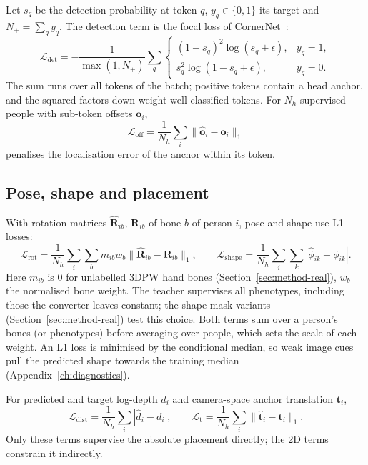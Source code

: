 Let $s_q$ be the detection probability at token $q$, $y_q\in\{0,1\}$ its target and $N_+=\sum_q y_q$. The detection
term is the focal loss of CornerNet~\cite{law2018cornernet}:
\begin{equation}
 \mathcal L_{\mathrm{det}}=
 -\frac{1}{\max(1,N_+)}\sum_q
\begin{cases}
 (1-s_q)^2\log(s_q+\epsilon), & y_q=1,\\
 s_q^2\log(1-s_q+\epsilon), & y_q=0 .
\end{cases}
\label{eq:loss-detection}
\end{equation}
The sum runs over all tokens of the batch; positive tokens contain a head anchor, and the squared factors down-weight
well-classified tokens. For
$N_h$ supervised people with sub-token offsets $\mathbf o_i$,
\begin{equation}
 \mathcal L_{\mathrm{off}}=\frac{1}{N_h}\sum_i
 \|\widehat{\mathbf o}_i-\mathbf o_i\|_1
\label{eq:loss-offset}
\end{equation}
penalises the localisation error of the anchor within its token.

\subsection{Pose, shape and placement}

With rotation matrices $\widehat{\mathbf R}_{ib}$, $\mathbf R_{ib}$ of bone $b$ of person $i$, pose and shape use L1
losses:
\begin{equation}
 \mathcal L_{\mathrm{rot}}=\frac{1}{N_h}\sum_i\sum_b
 m_{ib}w_b\|\widehat{\mathbf R}_{ib}-\mathbf R_{ib}\|_1,\qquad
 \mathcal L_{\mathrm{shape}}=\frac{1}{N_h}\sum_i\sum_k
 |\widehat{\phi}_{ik}-\phi_{ik}|.
\label{eq:loss-parameters}
\end{equation}
Here $m_{ib}$ is 0 for unlabelled 3DPW hand bones (Section~\ref{sec:method-real}), $w_b$ the normalised bone weight. The teacher supervises all phenotypes, including those the converter leaves constant; the shape-mask variants
(Section~\ref{sec:method-real}) test this choice. Both terms sum over a person's bones (or phenotypes) before
averaging over people, which sets the scale of each weight. An L1
loss is minimised by the conditional median, so weak image cues pull the predicted shape towards the training median
(Appendix~\ref{ch:diagnostics}).

For predicted and target log-depth $d_i$ and camera-space anchor translation $\mathbf t_i$,
\begin{equation}
 \mathcal L_{\mathrm{dist}}=\frac{1}{N_h}\sum_i|\widehat d_i-d_i|,\qquad
 \mathcal L_{\mathrm t}=\frac{1}{N_h}\sum_i\|\widehat{\mathbf t}_i-\mathbf t_i\|_1 .
\label{eq:loss-placement}
\end{equation}
Only these terms supervise the absolute placement directly; the 2D terms constrain it indirectly.

